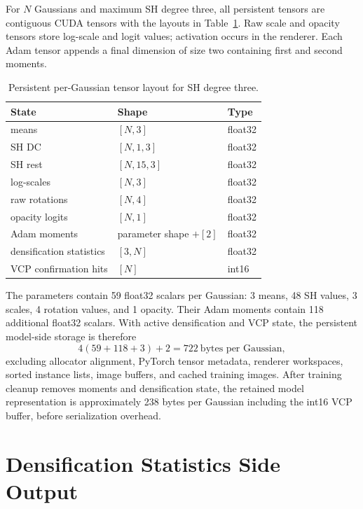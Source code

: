For $N$ Gaussians and maximum SH degree three, all persistent tensors are contiguous CUDA tensors with the layouts in Table~\ref{tab:tensor-layout}. Raw scale and opacity tensors store log-scale and logit values; activation occurs in the renderer. Each Adam tensor appends a final dimension of size two containing first and second moments.

\begin{table}[H]
\centering
\caption{Persistent per-Gaussian tensor layout for SH degree three.}
\label{tab:tensor-layout}
\begin{tabular}{lll}
\toprule
State & Shape & Type \\
\midrule
means & $[N,3]$ & float32 \\
SH DC & $[N,1,3]$ & float32 \\
SH rest & $[N,15,3]$ & float32 \\
log-scales & $[N,3]$ & float32 \\
raw rotations & $[N,4]$ & float32 \\
opacity logits & $[N,1]$ & float32 \\
Adam moments & parameter shape $+[2]$ & float32 \\
densification statistics & $[3,N]$ & float32 \\
VCP confirmation hits & $[N]$ & int16 \\
\bottomrule
\end{tabular}
\end{table}

The parameters contain 59 float32 scalars per Gaussian: 3 means, 48 SH values, 3 scales, 4 rotation values, and 1 opacity. Their Adam moments contain 118 additional float32 scalars. With active densification and VCP state, the persistent model-side storage is therefore
\begin{equation}
4(59+118+3)+2=722\ \text{bytes per Gaussian},
\end{equation}
excluding allocator alignment, PyTorch tensor metadata, renderer workspaces, sorted instance lists, image buffers, and cached training images. After training cleanup removes moments and densification state, the retained model representation is approximately 238 bytes per Gaussian including the int16 VCP buffer, before serialization overhead.

\section{Densification Statistics Side Output}

